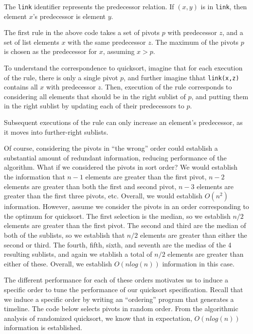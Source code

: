 The {\tt link} identifier represents the predecessor relation.  If $(x,y)$ is in {\tt link}, then element $x$'s predecessor is element $y$.

The first rule in the above code takes a set of pivots $p$ with predecessor $z$, and a set of list elements $x$ with the same predecessor $z$.  The maximum of the pivots $p$ is chosen as the predecessor for $x$, assuming $x > p$.

To understand the correspondence to quicksort, imagine that for each execution of the rule, there is only a single pivot $p$, and further imagine thhat {\tt link(x,z)} contains all $x$ with predecessor $z$.  Then, execution of the rule corresponds to considering all elements that should be in the right sublist of $p$, and putting them in the right sublist by updating each of their predecessors to $p$.  

Subsequent executions of the rule can only increase an element's predecessor, as it moves into further-right sublists.

Of course, considering the pivots in “the wrong” order could establish a substantial amount of redundant information, reducing performance of the algorithm.  What if we considered the pivots in sort order?  We would establish the information that $n-1$ elements are greater than the first pivot, $n-2$ elements are greater than both the first and second pivot, $n-3$ elements are greater than the first three pivots, etc.  Overall, we would establish $O(n^2)$ information.  However, assume we consider the pivots in an order corresponding to the optimum for quicksort.  The first selection is the median, so we establish $n/2$ elements are greater than the first pivot.  The second and third are the median of both of the sublists, so we establish that $n/2$ elements are greater than either the second or third.  The fourth, fifth, sixth, and seventh are the medias of the 4 resulting sublists, and again we stablish a total of $n/2$ elements are greater than either of these.  Overall, we establish $O(n log(n))$ information in this case.

The different performance for each of these orders motivates us to induce a specific order to tune the performance of our quicksort specification.  Recall that we induce a specific order by writing an ``ordering'' program that generates a timeline.  The code below selects pivots in random order.  From the algorithmic analysis of randomized quicksort, we know that in expectation, $O(n log(n))$ information is established.

